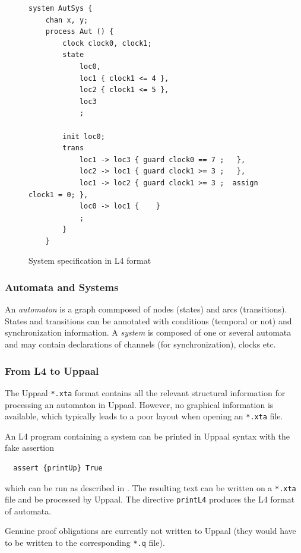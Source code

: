 \begin{figure}
  \begin{lstlisting}
system AutSys {
    chan x, y;
    process Aut () {
        clock clock0, clock1;
        state
            loc0,
            loc1 { clock1 <= 4 },
            loc2 { clock1 <= 5 },
            loc3
            ;

        init loc0;
        trans
            loc1 -> loc3 { guard clock0 == 7 ;   },
            loc2 -> loc1 { guard clock1 >= 3 ;   },
            loc1 -> loc2 { guard clock1 >= 3 ;  assign clock1 = 0; },
            loc0 -> loc1 {    }
            ;
        }
    }
  \end{lstlisting}
  \caption{System specification in L4 format}\label{fig:system_l4}
\end{figure}



\subsubsection{Automata and Systems}

An \emph{automaton} is a graph commposed of nodes (states) and arcs
(transitions). States and transitions can be annotated with conditions
(temporal or not) and synchronization information. A \emph{system} is composed
of one or several automata and may contain declarations of channels (for
synchronization), clocks etc.


\subsubsection{From L4 to Uppaal}

The Uppaal \texttt{*.xta} format contains all the relevant structural
information for processing an automaton in Uppaal. However, no graphical
information is available, which typically leads to a poor layout when opening
an \texttt{*.xta} file.

An L4 program containing a system can be printed in Uppaal syntax with the
fake assertion
\begin{lstlisting}
  assert {printUp} True
\end{lstlisting}
which can be run as described in . The resulting
text can be written on a \texttt{*.xta} file and be processed by Uppaal. The
directive \texttt{printL4} produces the L4 format of automata.

Genuine proof obligations are currently not written to Uppaal (they would have
to be written to the corresponding \texttt{*.q} file).


